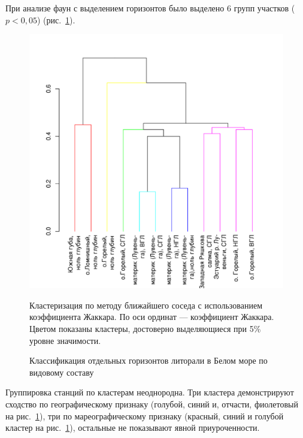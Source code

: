 При анализе фаун с выделением горизонтов было выделено 6 групп участков ($p<0,05$) (рис.~\ref{ris:cluster_white_species_tidal}). 
	\begin{figure}[p]
		\begin{center}
			\includegraphics{../White_Sea/soobshestvo/White_fauna_tidal_jaccard_single_1.pdf}
		\end{center}
	\caption{Классификация отдельных горизонтов литорали в Белом море по видовому составу}
	\label{ris:cluster_white_species_tidal}

	\footnotesize{Кластеризация по методу ближайшего соседа с использованием коэффициента Жаккара. По оси ординат --- коэффициент Жаккара. Цветом показаны кластеры, достоверно выделяющиеся при 5\% уровне значимости.}
	\end{figure}
Группировка станций по кластерам неоднородна. 
Три кластера демонстрируют сходство по географическому признаку (голубой, синий и, отчасти, фиолетовый на рис.~\ref{ris:cluster_white_species_tidal}), три по мареографическому признаку (красный, синий и голубой кластер на рис.~\ref{ris:cluster_white_species_tidal}), остальные не показывают явной приуроченности.


